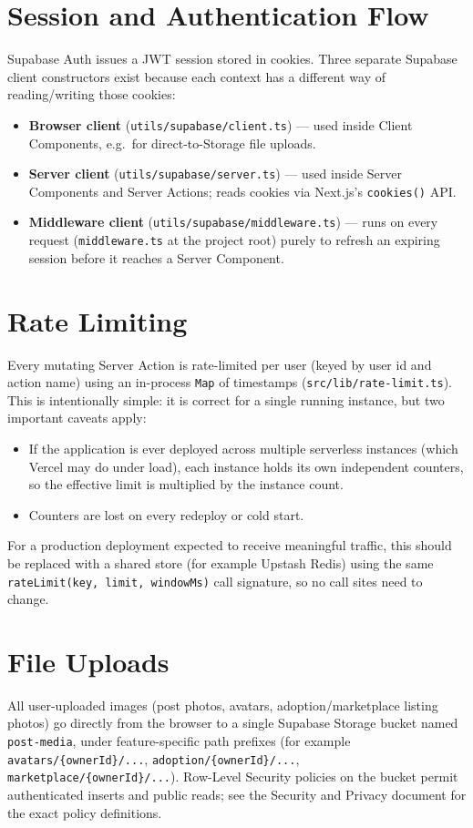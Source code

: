 \documentclass[11pt,a4paper]{article}
\begin{document}
\section{Session and Authentication Flow}
Supabase Auth issues a JWT session stored in cookies. Three separate Supabase client
constructors exist because each context has a different way of reading/writing those
cookies:

\begin{itemize}[leftmargin=*]
  \item \textbf{Browser client} (\texttt{utils/supabase/client.ts}) --- used inside
        Client Components, e.g.\ for direct-to-Storage file uploads.
  \item \textbf{Server client} (\texttt{utils/supabase/server.ts}) --- used inside
        Server Components and Server Actions; reads cookies via Next.js's
        \texttt{cookies()} API.
  \item \textbf{Middleware client} (\texttt{utils/supabase/middleware.ts}) --- runs on
        every request (\texttt{middleware.ts} at the project root) purely to refresh an
        expiring session before it reaches a Server Component.
\end{itemize}

\section{Rate Limiting}
\label{sec:rate-limiting}
Every mutating Server Action is rate-limited per user (keyed by user id and action
name) using an in-process \texttt{Map} of timestamps
(\texttt{src/lib/rate-limit.ts}). This is intentionally simple: it is correct for a
single running instance, but two important caveats apply:

\begin{itemize}[leftmargin=*]
  \item If the application is ever deployed across multiple serverless instances
        (which Vercel may do under load), each instance holds its own independent
        counters, so the effective limit is multiplied by the instance count.
  \item Counters are lost on every redeploy or cold start.
\end{itemize}

For a production deployment expected to receive meaningful traffic, this should be
replaced with a shared store (for example Upstash Redis) using the same
\texttt{rateLimit(key, limit, windowMs)} call signature, so no call sites need to
change.

\section{File Uploads}
All user-uploaded images (post photos, avatars, adoption/marketplace listing photos)
go directly from the browser to a single Supabase Storage bucket named
\texttt{post-media}, under feature-specific path prefixes (for example
\texttt{avatars/\{ownerId\}/...}, \texttt{adoption/\{ownerId\}/...},
\texttt{marketplace/\{ownerId\}/...}). Row-Level Security policies on the bucket permit
authenticated inserts and public reads; see the Security and Privacy document for the
exact policy definitions.
\end{document}
